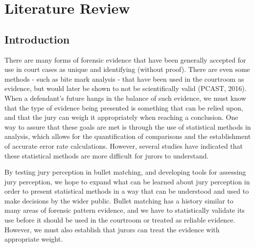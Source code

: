 \documentclass[print]{nuthesis}
\begin{document}

\tableofcontents

\listoffigures
\listoftables

\mainmatter


\hypertarget{litreview}{%
\chapter{Literature Review}\label{litreview}}

\hypertarget{introduction}{%
\section{Introduction}\label{introduction}}

There are many forms of forensic evidence that have been generally accepted for use in court cases as unique and identifying (without proof).
There are even some methods - such as bite mark analysis - that have been used in the courtroom as evidence, but would later be shown to not be scientifically valid (PCAST, 2016).
When a defendant's future hangs in the balance of such evidence, we must know that the type of evidence being presented is something that can be relied upon, and that the jury can weigh it appropriately when reaching a conclusion.
One way to assure that these goals are met is through the use of statistical methods in analysis, which allows for the quantification of comparisons and the establishment of accurate error rate calculations.
However, several studies have indicated that these statistical methods are more difficult for jurors to understand.

By testing jury perception in bullet matching, and developing tools for assessing jury perception, we hope to expand what can be learned about jury perception in order to present statistical methods in a way that can be understood and used to make decisions by the wider public.
Bullet matching has a history similar to many areas of forensic pattern evidence, and we have to statistically validate its use before it should be used in the courtroom or treated as reliable evidence.
However, we must also establish that jurors can treat the evidence with appropriate weight.
\end{document}
